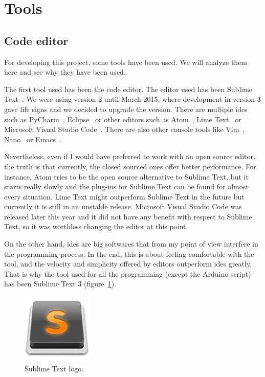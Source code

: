 \section{Tools}

\subsection{Code editor}

For developing this project, some tools have been used. We will analyze them here and see why they
have been used.

The first tool used has been the code editor. The editor used has been Sublime
Text~\cite{sublime_web}. We were using version 2 until March 2015, where development in version 3
gave life signs and we decided to upgrade the version. There are multiple \acrshort{ide}s such as
PyCharm~\cite{pycharm_web}, Eclipse~\cite{eclipse_web} or other editors such as
Atom~\cite{atom_web}, Lime Text~\cite{lime_web} or Microsoft Visual Studio Code~\cite{ms_code_web}.
There are also other console tools like Vim~\cite{vim_web}, Nano~\cite{nano_web} or
Emacs~\cite{emacs_web}.

Nevertheless, even if I would have preferred to work with an open source editor, the truth is that
currently, the closed sourced ones offer better performance. For instance, Atom tries to be the
open source alternative to Sublime Text, but it starts really slowly and the plug-ins for Sublime
Text can be found for almost every situation. Lime Text might outperform Sublime Text in the future
but currently it is still in an unstable release. Microsoft Visual Studio Code was released later
this year and it did not have any benefit with respect to Sublime Text, so it was worthless changing
the editor at this point.

On the other hand, \acrshort{ide}s are big softwares that from my point of view interfere in the
programming process. In the end, this is about feeling comfortable with the tool, and the velocity
and simplicity offered by editors outperform \acrshort{ide}s greatly. That is why the tool used for
all the programming (except the Arduino script) has been Sublime Text 3 (figure~\ref{fig:sublime}).

\begin{figure}[!htbp]
	\centering
	\includegraphics[width=0.3\textwidth]{fig/sublime}
	\caption{Sublime Text logo.}
	\label{fig:sublime}
\end{figure}

